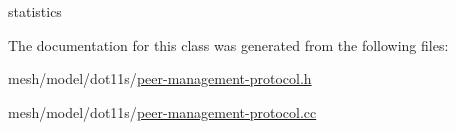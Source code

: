 statistics 



The documentation for this class was generated from the following files\+:\begin{DoxyCompactItemize}
\item 
mesh/model/dot11s/\hyperlink{peer-management-protocol_8h}{peer-\/management-\/protocol.\+h}\item 
mesh/model/dot11s/\hyperlink{peer-management-protocol_8cc}{peer-\/management-\/protocol.\+cc}\end{DoxyCompactItemize}
